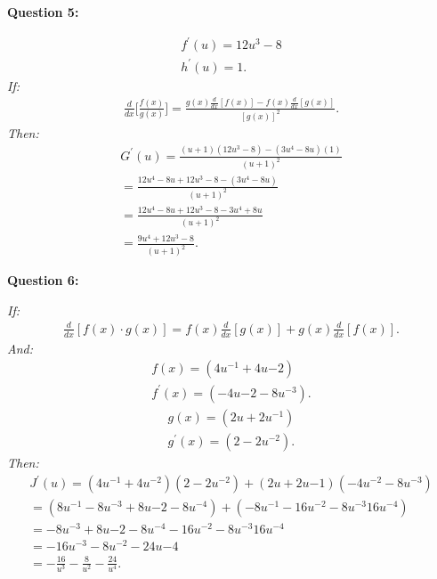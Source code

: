 \documentclass{report}
\begin{document}
    \bigbreak \noindent \bigbreak \noindent 
    \begin{Large}
        \textbf{Question 5:}
    \end{Large}
    \bigbreak \noindent 
    \bigbreak \noindent 
    \begin{align*}
        f ^{\prime}(u) = 12u^3-8 \\
        h ^{\prime}(u) = 1
    .\end{align*}
    \bigbreak \noindent 
    \textit{If:}
    \begin{align*}
        \frac{d}{dx}\bigg[ \frac{f(x)}{g(x)}\bigg] = \frac{g(x) \frac{d}{dx}[f(x)] - f(x) \frac{d}{dx}[g(x)]}{[g(x)]^2}
    .\end{align*}
    \bigbreak \noindent 
    \textit{Then:}
    \begin{align*}
        G ^{\prime}(u) = \frac{(u+1)(12u^3-8)-(3u^4-8u)(1)}{(u+1)^2} \\ 
        = \frac{12u^4-8u+12u^3-8-(3u^4-8u)}{(u+1)^2} \\
        = \frac{12u^4-8u+12u^3-8-3u^4+8u}{(u+1)^2} \\ 
        = \frac{9u^4+12u^3-8}{(u+1)^2}
    .\end{align*}

    \bigbreak \noindent \bigbreak \noindent 
    \begin{Large}
        \textbf{Question 6:}
    \end{Large}
    \bigbreak \noindent 
    \bigbreak \noindent 
    \textit{If:}
    \begin{align*}
        \frac{d}{dx}[f(x) \cdot g(x)] = f(x) \frac{d}{dx}[g(x)] + g(x) \frac{d}{dx}[f(x)]
    .\end{align*}
    \bigbreak \noindent 
    \textit{And:}
    \begin{align*}
        f(x) = (4u^{-1}+4u{-2}) \\
        f ^{\prime}(x) = (-4u{-2}-8u^{-3})
    .\end{align*}
    \begin{align*}
        g(x) = (2u+2u^{-1}) \\ 
        g ^{\prime}(x) = (2-2u^{-2})
    .\end{align*}
    \bigbreak \noindent 
    \textit{Then:}
    \begin{align*}
        J ^{\prime}(u) = (4u^{-1}+4u^{-2})(2-2u^{-2}) + (2u+2u{-1})(-4u^{-2}-8u^{-3}) \\ 
        = (8u^{-1}-8u^{-3}+8u{-2}-8u^{-4}) + (-8u^{-1}-16u^{-2}-8u^{-3}16u^{-4}) \\ 
        = -8u^{-3}+8u{-2}-8u^{-4} -16u^{-2}-8u^{-3}16u^{-4} \\ 
        = -16u^{-3} -8u^{-2}-24u{-4} \\ 
        = -\frac{16}{u^3} - \frac{8}{u^2} - \frac{24}{u^4}
    .\end{align*}
\end{document}

